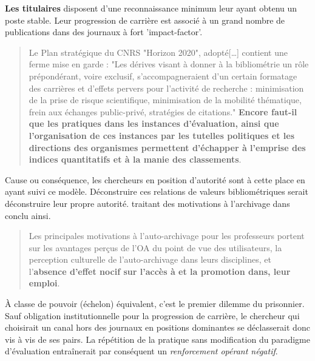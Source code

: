 \textbf{Les titulaires} disposent d'une reconnaissance minimum leur ayant obtenu un poste stable.
Leur progression de carrière est associé à un grand nombre de publications dans des journaux à fort 'impact-factor'.
\blockcquote{matzkin_levaluation_2009}{Le Plan stratégique du CNRS "Horizon 2020", adopté[\ldots] contient une ferme mise en garde : "Les dérives visant à donner à la bibliométrie un rôle prépondérant, voire exclusif, s’accompagneraient d’un certain formatage des carrières et d’effets pervers pour l’activité de recherche : minimisation de la prise de risque scientifique, minimisation de la mobilité thématique, frein aux échanges public-privé, stratégies de citations." \textbf{Encore faut-il que les pratiques dans les instances d’évaluation, ainsi que l’organisation de ces instances par les tutelles politiques et les directions des organismes permettent d’échapper à l’emprise des indices quantitatifs et à la manie des classements}.}
Cause ou conséquence, les chercheurs en position d'autorité sont à cette place en ayant suivi ce modèle.
Déconstruire ces relations de valeurs bibliométriques serait déconstruire leur propre autorité.
\citeauthor{kim_faculty_2010} traitant des motivations à l'archivage dans  conclu ainsi.
\blockcquote[traduction]{kim_faculty_2010}{
Les principales motivations à l'auto-archivage pour les professeurs portent sur les avantages perçus de l'\gls{OA} du point de vue des utilisateurs, la perception culturelle de l'auto-archivage dans leurs disciplines, et l'\textbf{absence d'effet nocif sur l'accès à et la promotion dans, leur emploi}.
}
À classe de pouvoir (échelon) équivalent, c'est le premier dilemme du prisonnier.
Sauf obligation institutionnelle pour la progression de carrière, le chercheur qui choisirait un canal hors des journaux en positions dominantes se déclasserait donc vis à vis de ses pairs.
La répétition de la pratique sans modification du paradigme d'évaluation entraînerait par conséquent un \emph{renforcement opérant négatif}.

